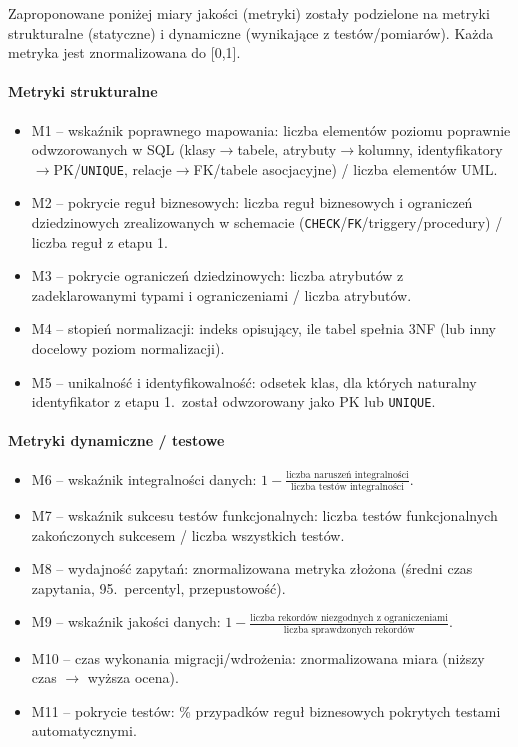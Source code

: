 Zaproponowane poniżej miary jakości (metryki) zostały podzielone na metryki strukturalne (statyczne) i dynamiczne (wynikające z testów/pomiarów). Każda metryka jest znormalizowana do [0,1].

\paragraph{Metryki strukturalne}

\begin{itemize}
  \item M1 -- wskaźnik poprawnego mapowania: liczba elementów poziomu poprawnie odwzorowanych w SQL (klasy$\rightarrow$tabele, atrybuty$\rightarrow$kolumny, identyfi\-katory$\rightarrow$PK/\texttt{UNIQUE}, relacje$\rightarrow$FK/tabele asocjacyjne) / liczba elementów UML.
  \item M2 -- pokrycie reguł biznesowych: liczba reguł biznesowych i ograniczeń dziedzinowych zrealizowanych w schemacie (\texttt{CHECK}/\texttt{FK}/triggery/procedury) / liczba reguł z etapu 1.
  \item M3 -- pokrycie ograniczeń dziedzinowych: liczba atrybutów z zadeklarowanymi typami i ograniczeniami / liczba atrybutów.
  \item M4 -- stopień normalizacji: indeks opisujący, ile tabel spełnia 3NF (lub inny docelowy poziom normalizacji).
  \item M5 -- unikalność i identyfikowalność: odsetek klas, dla których naturalny identyfikator z etapu 1.\ został odwzorowany jako PK lub \texttt{UNIQUE}.
\end{itemize}

\paragraph{Metryki dynamiczne / testowe}

\begin{itemize}
  \item M6 -- wskaźnik integralności danych: $1 - \frac{\text{liczba naruszeń integralności}}{\text{liczba testów integralności}}$.
  \item M7 -- wskaźnik sukcesu testów funkcjonalnych: liczba testów funkcjonalnych zakończonych sukcesem / liczba wszystkich testów.
  \item M8 -- wydajność zapytań: znormalizowana metryka złożona (średni czas zapytania, 95.\ percentyl, przepustowość).
  \item M9 -- wskaźnik jakości danych: $1 - \frac{\text{liczba rekordów niezgodnych z ograniczeniami}}{\text{liczba sprawdzonych rekordów}}$.
  \item M10 -- czas wykonania migracji/wdrożenia: znormalizowana miara (niższy czas $\rightarrow$ wyższa ocena).
  \item M11 -- pokrycie testów: \% przypadków reguł biznesowych pokrytych testami automatycznymi.
\end{itemize}

